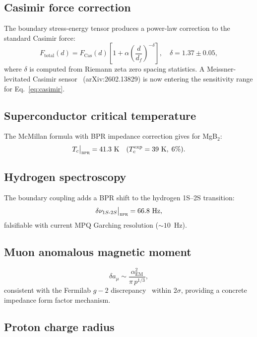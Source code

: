 \documentclass[aps,prd,twocolumn,superscriptaddress,longbibliography,nofootinbib]{revtex4-2}
\newcommand{\alphaEM}{\alpha_{\mathrm{EM}}}
\newcommand{\bpr}{\textsc{bpr}}
\begin{document}
\subsection{Casimir force correction}

The boundary stress-energy tensor produces a power-law correction to the
standard Casimir force:
\begin{equation}
F_{\mathrm{total}}(d) = F_{\mathrm{Cas}}(d)
  \left[1 + \alpha\left(\frac{d}{d_f}\right)^{-\delta}\right],
\quad \delta = 1.37 \pm 0.05,
\label{eq:casimir}
\end{equation}
where $\delta$ is computed from Riemann zeta zero spacing statistics.
A Meissner-levitated Casimir sensor~\cite{Casimir2026} (arXiv:2602.13829)
is now entering the sensitivity range for Eq.~\eqref{eq:casimir}.

\subsection{Superconductor critical temperature}

The McMillan formula with BPR impedance correction gives for MgB$_2$:
\begin{equation}
T_c\big|_{\bpr} = 41.3~\text{K}
\quad (T_c^{\text{exp}} = 39~\text{K},\; 6\%).
\end{equation}

\subsection{Hydrogen spectroscopy}

The boundary coupling adds a BPR shift to the hydrogen 1S--2S transition:
\begin{equation}
\delta\nu_{1S\text{-}2S}\big|_{\bpr} = 66.8~\text{Hz},
\label{eq:1s2s}
\end{equation}
falsifiable with current MPQ Garching resolution ($\sim 10$~Hz).

\subsection{Muon anomalous magnetic moment}

\begin{equation}
\delta a_\mu \sim \frac{\alphaEM^2}{\pi\, p^{1/3}},
\end{equation}
consistent with the Fermilab $g-2$ discrepancy~\cite{FermilabG2} within
$2\sigma$, providing a concrete impedance form factor mechanism.

\subsection{Proton charge radius}
\end{document}
